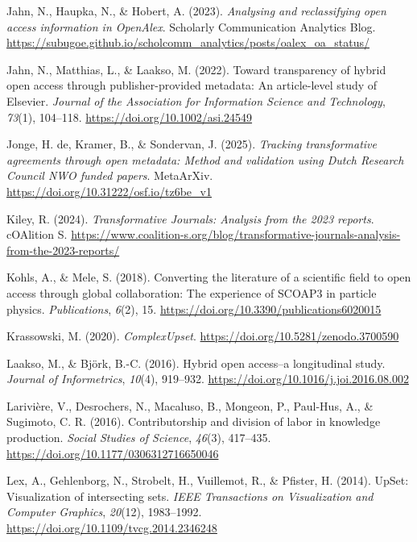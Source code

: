 \documentclass[a4paper,man,floatsintext,longtable,noextraspace,10pt]{apa6}
\newlength{\cslhangindent}
\newenvironment{CSLReferences}[2] %
{\begin{list}{}{%
  \setlength{\itemindent}{0pt}
  \setlength{\leftmargin}{0pt}
  \setlength{\parsep}{0pt}
  \ifodd #1
  \setlength{\leftmargin}{\cslhangindent}
  \setlength{\itemindent}{-1\cslhangindent}
  \fi
  \setlength{\itemsep}{#2\baselineskip}}}
{\end{list}}
\begin{document}
\begin{CSLReferences}{1}{0}
Jahn, N., Haupka, N., \& Hobert, A. (2023). \emph{Analysing and
reclassifying open access information in OpenAlex}. {Scholarly
Communication Analytics Blog}.
\url{https://subugoe.github.io/scholcomm_analytics/posts/oalex_oa_status/}

Jahn, N., Matthias, L., \& Laakso, M. (2022). Toward transparency of
hybrid open access through publisher-provided metadata: An article-level
study of {Elsevier}. \emph{Journal of the Association for Information
Science and Technology}, \emph{73}(1), 104--118.
\url{https://doi.org/10.1002/asi.24549}

Jonge, H. de, Kramer, B., \& Sondervan, J. (2025). \emph{Tracking
transformative agreements through open metadata: Method and validation
using {Dutch Research Council NWO} funded papers}. MetaArXiv.
\url{https://doi.org/10.31222/osf.io/tz6be_v1}

Kiley, R. (2024). \emph{{Transformative Journals}: Analysis from the
2023 reports}. {cOAlition S}.
\url{https://www.coalition-s.org/blog/transformative-journals-analysis-from-the-2023-reports/}

Kohls, A., \& Mele, S. (2018). Converting the literature of a scientific
field to open access through global collaboration: The experience of
SCOAP3 in particle physics. \emph{Publications}, \emph{6}(2), 15.
\url{https://doi.org/10.3390/publications6020015}

Krassowski, M. (2020). \emph{ComplexUpset}.
\url{https://doi.org/10.5281/zenodo.3700590}

Laakso, M., \& Björk, B.-C. (2016). Hybrid open access--a longitudinal
study. \emph{Journal of Informetrics}, \emph{10}(4), 919--932.
\url{https://doi.org/10.1016/j.joi.2016.08.002}

Larivière, V., Desrochers, N., Macaluso, B., Mongeon, P., Paul-Hus, A.,
\& Sugimoto, C. R. (2016). Contributorship and division of labor in
knowledge production. \emph{Social Studies of Science}, \emph{46}(3),
417--435. \url{https://doi.org/10.1177/0306312716650046}

Lex, A., Gehlenborg, N., Strobelt, H., Vuillemot, R., \& Pfister, H.
(2014). UpSet: Visualization of intersecting sets. \emph{IEEE
Transactions on Visualization and Computer Graphics}, \emph{20}(12),
1983--1992. \url{https://doi.org/10.1109/tvcg.2014.2346248}


\end{CSLReferences}
\end{document}

